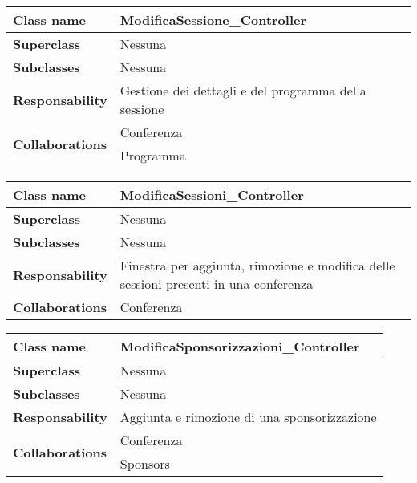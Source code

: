 \begin{table}[h!]
	\begin{tabular}{|l|l|}
		\hline 
		\textbf{Class name} & ModificaSessione\_Controller
		\\ \hline
		\textbf{Superclass} & Nessuna
		\\ \hline
		\multirow{1}{*}{\textbf{Subclasses}} & Nessuna
		\\ \hline
		\textbf{Responsability} & Gestione dei dettagli e del programma della sessione
		\\ \hline
		\multirow{2}{*}{\textbf{Collaborations}} & Conferenza \\
		& Programma \\ \hline
	\end{tabular}
\end{table}
\begin{table}[h!]
	\begin{tabular}{|l|l|}
		\hline 
		\textbf{Class name} & ModificaSessioni\_Controller
		\\ \hline
		\textbf{Superclass} & Nessuna
		\\ \hline
		\multirow{1}{*}{\textbf{Subclasses}} & Nessuna
		\\ \hline
		\textbf{Responsability} & Finestra per aggiunta, rimozione e modifica delle sessioni presenti in una conferenza
		\\ \hline
		\multirow{1}{*}{\textbf{Collaborations}} & Conferenza
		\\ \hline
	\end{tabular}
\end{table}
\begin{table}[h!]
	\begin{tabular}{|l|l|}
		\hline 
		\textbf{Class name} & ModificaSponsorizzazioni\_Controller
		\\ \hline
		\textbf{Superclass} & Nessuna
		\\ \hline
		\multirow{1}{*}{\textbf{Subclasses}} & Nessuna
		\\ \hline
		\textbf{Responsability} & Aggiunta e rimozione di una sponsorizzazione
		\\ \hline
		\multirow{2}{*}{\textbf{Collaborations}} & Conferenza \\
		& Sponsors		\\ \hline
	\end{tabular}
\end{table}

